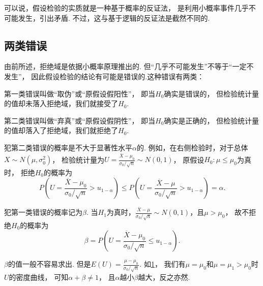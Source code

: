 可以说，假设检验的实质就是一种基于概率的反证法，
是利用小概率事件几乎不可能发生，引出矛盾.
不过，这与基于逻辑的反证法是截然不同的.


\subsection{两类错误}
由前所述，拒绝域是依据小概率原理推出的.
但“几乎不可能发生”不等于“一定不发生”，
因此假设检验的结论有可能是错误的.这种错误有两类：

第一类错误叫做“取伪”或“原假设假阳性”，
即当\(H_0\)确实是错误的，
但检验统计量的值却未落入拒绝域，我们就接受了\(H_0\).

第二类错误叫做“弃真”或“原假设假阴性”，
即当\(H_0\)确实是正确的，
但检验统计量的值却落入了拒绝域，我们就拒绝了\(H_0\).

犯第二类错误的概率是不大于显著性水平\(\alpha\)的.
例如，在右侧检验时，对于总体\(X \sim N(\mu,\sigma_0^2)\)，
检验统计量为\(U = \frac{\overline{X}-\mu_0}{\sigma_0 / \sqrt{n}} \sim N(0,1)\)，
原假设\(H_0: \mu\leq\mu_0\)为真时，
拒绝\(H_0\)的概率为\[
	P\left(U=\frac{\overline{X}-\mu_0}{\sigma_0 / \sqrt{n}}>u_{1-\alpha}\right)
	\leq P\left(U=\frac{\overline{X}-\mu}{\sigma_0 / \sqrt{n}}>u_{1-\alpha}\right)
	= \alpha.
\]

犯第一类错误的概率记为\(\beta\).
当\(H_1\)为真时，\(\frac{\overline{X}-\mu}{\sigma_0/\sqrt{n}} \sim N(0,1)\)，且\(\mu>\mu_0\)，
故不拒绝\(H_0\)的概率为\[
	\beta=P\left(U=\frac{\overline{X}-\mu_0}{\sigma_0/\sqrt{n}} \leq u_{1-\alpha}\right).
\]

\(\beta\)的值一般不容易求出.
但是\(E(U)=\frac{\mu-\mu_0}{\sigma_0/\sqrt{n}}\).
如\cref{figure:假设检验.两类错误}，
我们有\(\mu=\mu_0\)和\(\mu=\mu_1>\mu_0\)时\(U\)的密度曲线，
可知\(\alpha+\beta\neq1\)，
且\(\alpha\)越小\(\beta\)越大，反之亦然.

\begin{figure}[htb]
	\centering
	\caption{}
	\label{figure:假设检验.两类错误}
\end{figure}

